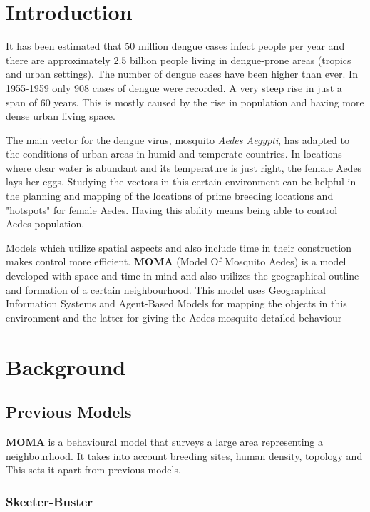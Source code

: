 \section{Introduction}

It has been estimated that 50 million dengue cases infect people per year and there are approximately 2.5 billion people living in dengue-prone areas (tropics and urban settings). The number of dengue cases have been higher than ever. In 1955-1959 only 908 cases of dengue were recorded. A very steep rise in just a span of 60 years. This is mostly caused by the rise in population and having more dense urban living space.

The main vector for the dengue virus, mosquito \textit{Aedes Aegypti}, has adapted to the conditions of urban areas in humid and temperate countries. In locations where clear water is abundant and its temperature is just right, the female Aedes lays her eggs. Studying the vectors in this certain environment can be helpful in the planning and mapping of the locations of prime breeding locations and "hotspots" for female Aedes. Having this ability means being able to control Aedes population.

Models which utilize spatial aspects and also include time in their construction makes control more efficient. \textbf{MOMA} (Model Of Mosquito Aedes) is a model developed with space and time in mind and also utilizes the geographical outline and formation of a certain neighbourhood. This model uses Geographical Information Systems and Agent-Based Models for mapping the objects in this environment and the latter for giving the Aedes mosquito detailed behaviour

\section{Background}



\subsection{Previous Models}

\textbf{MOMA} is a behavioural model that surveys a large area representing a neighbourhood. It takes into account breeding sites, human density, topology and This sets it apart from previous models.

\subsubsection{Skeeter-Buster} 

